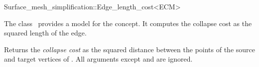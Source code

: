 

\begin{ccRefClass}{Surface_mesh_simplification::Edge_length_cost<ECM>}


\ccDefinition

The class \ccRefName\ provides a model for the  concept.
It computes the collapse cost as the squared length of the edge.


\ccIsModel
{}

\ccCreation
{}  %

  {Returns the {\em collapse cost} as the squared distance between the points
  of the source and target vertices of . All arguments 
  except  and  are ignored.
  }

\end{ccRefClass}


